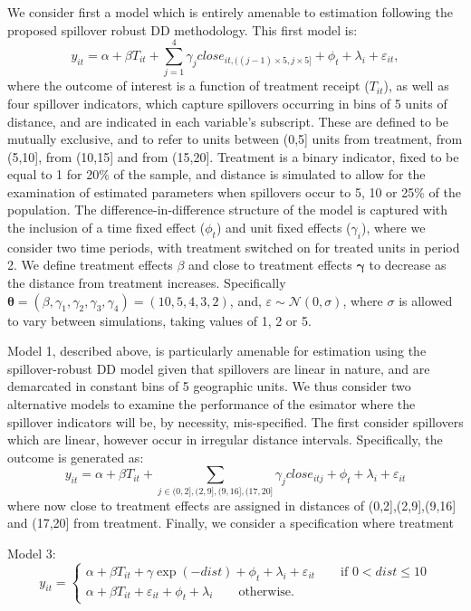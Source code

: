 \documentclass[12pt]{article}
\begin{document}
\begin{spacing}{1.3}
We consider first a model which is entirely amenable to estimation following
the proposed spillover robust DD methodology.  This first model is:
\[
y_{it} = \alpha + \beta T_{it} + \sum_{j=1}^4\gamma_jclose_{it,((j-1)\times5,j\times5]} + \phi_t + \lambda_i + \varepsilon_{it},
\]
where the outcome of interest is a function of treatment receipt ($T_{it}$),
as well as four spillover indicators, which capture spillovers occurring in
bins of 5 units of distance, and are indicated in each variable's subscript.
These are defined to be mutually exclusive, and
to refer to units between (0,5] units from treatment, from (5,10], from (10,15]
and from (15,20].  Treatment is a binary indicator, fixed to be equal to 1
for 20\% of the sample, and distance is simulated to allow for the examination
of estimated parameters when spillovers occur to 5, 10 or 25\% of the population.
The difference-in-difference structure of the model is captured with the inclusion
of a time fixed effect ($\phi_t$) and unit fixed effects ($\gamma_i$), where
we consider two time periods, with treatment switched on for treated units in
period 2.  We define treatment effects $\beta$ and close to treatment effects
$\bm{\gamma}$ to decrease as the distance from treatment increases.  Specifically
$\bm{\theta}=(\beta,\gamma_1,\gamma_2,\gamma_3,\gamma_4)=(10,5,4,3,2)$,
and, $\varepsilon\sim\mathcal{N}(0,\sigma)$, where $\sigma$ is allowed to vary
between simulations, taking values of 1, 2 or 5.

Model 1, described above, is particularly amenable for estimation using
the spillover-robust DD model given that spillovers are linear in nature,
and are demarcated in constant bins of 5 geographic units.  We thus consider
two alternative models to examine the performance of the esimator where
the spillover indicators will be, by necessity, mis-specified.  The first
consider spillovers which are linear, however occur in irregular distance
intervals.  Specifically, the outcome is generated as: 
\[
y_{it} = \alpha + \beta T_{it} + \sum_{j\in(0,2],(2,9],(9,16],(17,20]}\gamma_jclose_{itj} + \phi_t + \lambda_i + \varepsilon_{it}
\]
where now close to treatment effects are assigned in distances of
(0,2],(2,9],(9,16] and (17,20] from treatment.  Finally, we consider
a specification where treatment 

Model 3:
\[
y_{it}=\begin{cases}
\alpha + \beta T_{it} + \gamma \exp{(-dist)}+ \phi_t + \lambda_i+\varepsilon_{it} \qquad \text{if\ } 0 < dist \leq 10   \\
\alpha + \beta T_{it} + \varepsilon_{it}+ \phi_t + \lambda_i \qquad \text{otherwise}.
\end{cases}
\]


\end{spacing}
\end{document}
